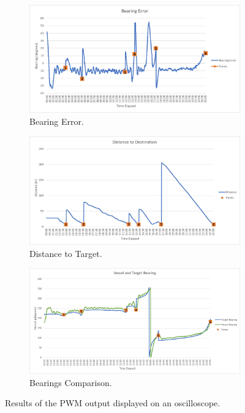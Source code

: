 \begin{figure}
	\begin{center}
		\begin{subfigure}{0.8\linewidth}
			\includegraphics[width = \linewidth]{figures/graphBearingError.jpg}
			\caption{Bearing Error.}
			\label{grph:4:BearingError}	
		\end{subfigure}
		\begin{subfigure}{0.8\linewidth}
			\includegraphics[width = \linewidth]{figures/graphDistance.jpg}
			\caption{Distance to Target.}
			\label{grph:4:distance}	
		\end{subfigure}
		\begin{subfigure}{0.8\linewidth}
			\includegraphics[width = \linewidth]{figures/graphBearings.jpg}
			\caption{Bearings Comparison.}
			\label{grph:4:2bearings}	
		\end{subfigure}
		\caption{Results of the PWM output displayed on an oscilloscope.}
		\label{fig:4:Results}
	\end{center}
\end{figure} 
